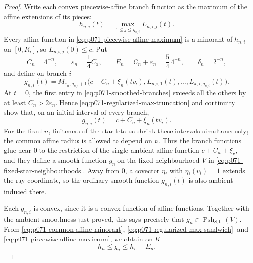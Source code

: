 \begin{proof}
Write each convex piecewise-affine branch function as the maximum of the
affine extensions of its pieces:
\begin{equation}
\label{eq:p071-piecewise-affine-maximum}
                  h_{n,i}(t)=\max_{1\leq j\leq q_{n,i}}L_{n,i,j}(t).
\end{equation}
Every affine function in \eqref{eq:p071-piecewise-affine-maximum} is a
minorant of $h_{n,i}$ on $[0,R_i]$, so
$L_{n,i,j}(0)\leq c$.  Put
\begin{equation}
\label{eq:p071-error-ledger}
 C_n=4^{-n},
 \qquad
 \varepsilon_n=\frac14C_n,
 \qquad
 E_n=C_n+\varepsilon_n=\frac54\,4^{-n},
 \qquad
 \delta_n=2^{-n},
\end{equation}
and define on branch $i$
\begin{equation}
\label{eq:p071-smoothed-branches}
 g_{n,i}(t)=M_{\varepsilon_n,q_{n,i}+1}
 \bigl(c+C_n+\xi_n(tv_i),
       L_{n,i,1}(t),\ldots,L_{n,i,q_{n,i}}(t)\bigr).
\end{equation}
At $t=0$, the first entry in \eqref{eq:p071-smoothed-branches} exceeds
all the others by at least $C_n>2\varepsilon_n$.  Hence
\eqref{eq:p071-regularized-max-truncation} and continuity show that, on an
initial interval of every branch,
\[
                          g_{n,i}(t)=c+C_n+\xi_n(tv_i).
\]
For the fixed $n$, finiteness of the star lets us shrink these intervals
simultaneously; the common affine radius is allowed to depend on $n$.
Thus the branch functions glue near $0$ to the restriction of the single
ambient affine function $c+C_n+\xi_n$, and they define a smooth function
$g_n$ on the fixed neighbourhood $V$ in
\eqref{eq:p071-fixed-star-neighbourhoods}.  Away from $0$, a covector
$\eta_i$ with $\eta_i(v_i)=1$ extends the ray coordinate, so the ordinary
smooth function $g_{n,i}(t)$ is also ambient-induced there.

Each $g_{n,i}$ is convex, since it is a convex function of affine
functions.  Together with the ambient smoothness just proved, this says
precisely that $g_n\in\operatorname{Psh}_{S,0}(V)$.  From
\eqref{eq:p071-common-affine-minorant},
\eqref{eq:p071-regularized-max-sandwich}, and
\eqref{eq:p071-piecewise-affine-maximum}, we obtain on $K$
\begin{equation}
\label{eq:p071-smoothing-sandwich}
                         h_n\leq g_n\leq h_n+E_n.
\end{equation}


\end{proof}

